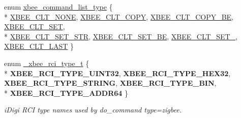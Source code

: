 \begin{DoxyCompactItemize}
enum \hyperlink{group__xbee__atcmd_ga1bd8ecd38c107579d20ded3c79a7d70b}{xbee\-\_\-command\-\_\-list\-\_\-type} \{ \\*
\hyperlink{group__xbee__atcmd_gga1bd8ecd38c107579d20ded3c79a7d70ba01bd43706bd844415cc0882b861df4d1}{X\-B\-E\-E\-\_\-\-C\-L\-T\-\_\-\-N\-O\-N\-E}, 
\hyperlink{group__xbee__atcmd_gga1bd8ecd38c107579d20ded3c79a7d70baef8d715c8725d801676943b868508633}{X\-B\-E\-E\-\_\-\-C\-L\-T\-\_\-\-C\-O\-P\-Y}, 
\hyperlink{group__xbee__atcmd_gga1bd8ecd38c107579d20ded3c79a7d70ba0be0c682bc30049849b0c169b661c537}{X\-B\-E\-E\-\_\-\-C\-L\-T\-\_\-\-C\-O\-P\-Y\-\_\-\-B\-E}, 
\hyperlink{group__xbee__atcmd_gga1bd8ecd38c107579d20ded3c79a7d70babea87822fa7171a077a3c1c88e3fa7dc}{X\-B\-E\-E\-\_\-\-C\-L\-T\-\_\-\-S\-E\-T}, 
\\*
\hyperlink{group__xbee__atcmd_gga1bd8ecd38c107579d20ded3c79a7d70baef4f9c1bf1001814d8b9e44c08c91c38}{X\-B\-E\-E\-\_\-\-C\-L\-T\-\_\-\-S\-E\-T\-\_\-\-S\-T\-R}, 
\hyperlink{group__xbee__atcmd_gga1bd8ecd38c107579d20ded3c79a7d70ba32b0b8fbea9aa5c2d6a8886ccbdbf609}{X\-B\-E\-E\-\_\-\-C\-L\-T\-\_\-\-S\-E\-T\-\_\-\-B\-E}, 
\hyperlink{group__xbee__atcmd_gga1bd8ecd38c107579d20ded3c79a7d70ba0eb2ffa9c761ab74335695f818ce8410}{X\-B\-E\-E\-\_\-\-C\-L\-T\-\_\-\-S\-E\-T\-\_}, 
\hyperlink{group__xbee__atcmd_gga1bd8ecd38c107579d20ded3c79a7d70ba6e78c45780bccbc7226af34868dc567f}{X\-B\-E\-E\-\_\-\-C\-L\-T\-\_\-\-L\-A\-S\-T}
 \}
\item 
enum \hyperlink{group__xbee__atcmd_gaa874b4a291f79f2e80f867ce71fccea5}{\-\_\-xbee\-\_\-rci\-\_\-type\-\_\-t} \{ \\*
{\bfseries X\-B\-E\-E\-\_\-\-R\-C\-I\-\_\-\-T\-Y\-P\-E\-\_\-\-U\-I\-N\-T32}, 
{\bfseries X\-B\-E\-E\-\_\-\-R\-C\-I\-\_\-\-T\-Y\-P\-E\-\_\-\-H\-E\-X32}, 
{\bfseries X\-B\-E\-E\-\_\-\-R\-C\-I\-\_\-\-T\-Y\-P\-E\-\_\-\-S\-T\-R\-I\-N\-G}, 
{\bfseries X\-B\-E\-E\-\_\-\-R\-C\-I\-\_\-\-T\-Y\-P\-E\-\_\-\-B\-I\-N}, 
\\*
{\bfseries X\-B\-E\-E\-\_\-\-R\-C\-I\-\_\-\-T\-Y\-P\-E\-\_\-\-A\-D\-D\-R64}
 \}
\begin{DoxyCompactList}\small\item\em i\-Digi R\-C\-I type names used by do\-\_\-command type=zigbee. \end{DoxyCompactList}\end{DoxyCompactItemize}
